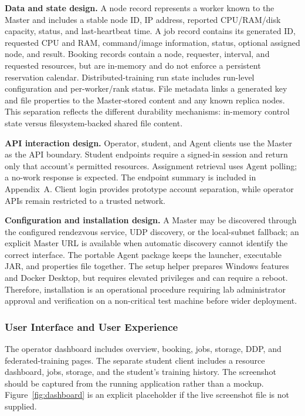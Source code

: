 \documentclass{article}
\begin{document}
\textbf{Data and state design.} A node record represents a worker known to the Master and includes a stable node ID, IP address, reported CPU/RAM/disk capacity, status, and last-heartbeat time. A job record contains its generated ID, requested CPU and RAM, command/image information, status, optional assigned node, and result. Booking records contain a node, requester, interval, and requested resources, but are in-memory and do not enforce a persistent reservation calendar. Distributed-training run state includes run-level configuration and per-worker/rank status. File metadata links a generated key and file properties to the Master-stored content and any known replica nodes. This separation reflects the different durability mechanisms: in-memory control state versus filesystem-backed shared file content.

\textbf{API interaction design.} Operator, student, and Agent clients use the Master as the API boundary. Student endpoints require a signed-in session and return only that account's permitted resources. Assignment retrieval uses Agent polling; a no-work response is expected. The endpoint summary is included in Appendix~A. Client login provides prototype account separation, while operator APIs remain restricted to a trusted network.

\textbf{Configuration and installation design.} A Master may be discovered through the configured rendezvous service, UDP discovery, or the local-subnet fallback; an explicit Master URL is available when automatic discovery cannot identify the correct interface. The portable Agent package keeps the launcher, executable JAR, and properties file together. The setup helper prepares Windows features and Docker Desktop, but requires elevated privileges and can require a reboot. Therefore, installation is an operational procedure requiring lab administrator approval and verification on a non-critical test machine before wider deployment.

    \subsubsection{User Interface and User Experience}
The operator dashboard includes overview, booking, jobs, storage, DDP, and federated-training pages. The separate student client includes a resource dashboard, jobs, storage, and the student's training history. The screenshot should be captured from the running application rather than a mockup. Figure~\ref{fig:dashboard} is an explicit placeholder if the live screenshot file is not supplied.
\end{document}

